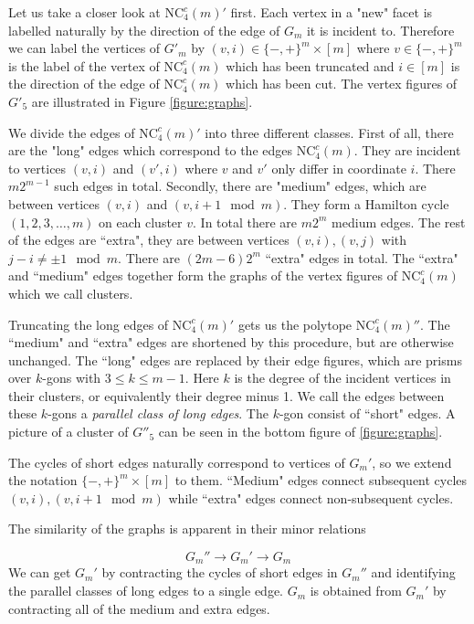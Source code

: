 \documentclass[a4paper,12pt]{book}
\theoremstyle{plain}
\theoremstyle{definition}
\newcommand\NCC{\mathrm{NC}^c}
\begin{document}
Let us take a closer look at $\NCC_4(m)'$ first.  Each vertex in a "new" facet is labelled naturally by
the direction of the edge of $G_m$ it is incident to. Therefore we can label the vertices of $G'_m$
by $(v,i) \in \{-,+\}^m \times [m]$ where $v \in \{-,+\}^m$ is the label of the vertex of $\NCC_4(m)$ which has been truncated and $i \in [m]$ 
is the direction of the edge of $\NCC_4(m)$ which has been cut. The vertex figures of $G'_5$ are illustrated in Figure \ref{figure:graphs}.

We divide the edges of $\NCC_4(m)'$ into three different classes. First of all, there are the "long" edges which correspond to the edges $\NCC_4(m)$.
They are incident to vertices $(v,i)$ and $(v',i)$ where $v$ and $v'$ only differ in coordinate $i$. There $m2^{m-1}$ such edges in total. Secondly, 
there are "medium" edges, which are between vertices $(v,i)$ and $(v,i+1\mod m)$. They form a Hamilton cycle $(1,2,3,\dots, m)$ on each cluster $v$. In total there are $m2^m$ medium edges. The rest of the edges are ``extra", they are between vertices $(v,i), (v,j)$ with $j-i \neq \pm 1 \mod m$.
There are $(2m-6)2^m$ ``extra" edges in total. The ``extra" and ``medium" edges together form the graphs of the vertex figures of $\NCC_4(m)$ which we call clusters. 

Truncating the long edges of $\NCC_4(m)'$ gets us the polytope $\NCC_4(m)''$. The ``medium" and ``extra" edges are shortened by this procedure, but are otherwise unchanged. The ``long" edges are replaced by their edge figures, which are prisms over $k$-gons with $3 \le k \le m-1$. Here $k$ is the degree of the incident vertices in their clusters, or equivalently their degree minus 1. We call the edges between these $k$-gons a \textit{parallel class of long edges}. The $k$-gon consist of ``short" edges. A picture of a cluster of $G''_5$ can be seen in the bottom figure of \ref{figure:graphs}.

The cycles of short edges naturally correspond to vertices of $G_m'$, so we extend the notation $\{-,+\}^m \times [m]$ to them. ``Medium" edges connect subsequent cycles $(v,i), (v,i+1 \mod m)$ while ``extra" edges connect non-subsequent cycles. 

The similarity of the graphs is apparent in their minor relations

\begin {equation}
G_m'' \rightarrow G_m' \rightarrow G_m
\end{equation}
We can get $G_m'$ by contracting the cycles of short edges in $G_m''$ and identifying the parallel classes of long edges 
to a single edge. $G_m$ is obtained from $G_m'$ by contracting all of the medium and extra edges.
\end{document}
